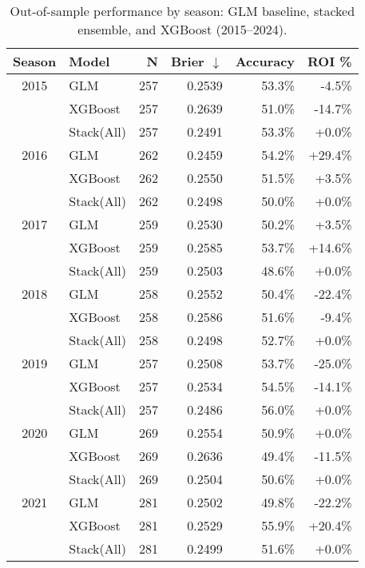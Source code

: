 \begin{table}[t]
  \centering
  \small
  \caption[Out-of-sample results by season]{Out-of-sample performance by season: GLM baseline, stacked ensemble, and XGBoost (2015--2024).}
  \label{tab:oos-record}
  \setlength{\tabcolsep}{2.5pt}\renewcommand{\arraystretch}{1.08}
  \begin{tabular}{@{} c l r r r r @{} }
    \toprule
    \textbf{Season} & \textbf{Model} & \textbf{N} & \textbf{Brier $\downarrow$} & \textbf{Accuracy} & \textbf{ROI \%} \\
    \midrule
    2015 & GLM & 257 & 0.2539 & 53.3\% & -4.5\% \\
     & XGBoost & 257 & 0.2639 & 51.0\% & -14.7\% \\
     & Stack(All) & 257 & 0.2491 & 53.3\% & +0.0\% \\
    \midrule
    2016 & GLM & 262 & 0.2459 & 54.2\% & +29.4\% \\
     & XGBoost & 262 & 0.2550 & 51.5\% & +3.5\% \\
     & Stack(All) & 262 & 0.2498 & 50.0\% & +0.0\% \\
    \midrule
    2017 & GLM & 259 & 0.2530 & 50.2\% & +3.5\% \\
     & XGBoost & 259 & 0.2585 & 53.7\% & +14.6\% \\
     & Stack(All) & 259 & 0.2503 & 48.6\% & +0.0\% \\
    \midrule
    2018 & GLM & 258 & 0.2552 & 50.4\% & -22.4\% \\
     & XGBoost & 258 & 0.2586 & 51.6\% & -9.4\% \\
     & Stack(All) & 258 & 0.2498 & 52.7\% & +0.0\% \\
    \midrule
    2019 & GLM & 257 & 0.2508 & 53.7\% & -25.0\% \\
     & XGBoost & 257 & 0.2534 & 54.5\% & -14.1\% \\
     & Stack(All) & 257 & 0.2486 & 56.0\% & +0.0\% \\
    \midrule
    2020 & GLM & 269 & 0.2554 & 50.9\% & +0.0\% \\
     & XGBoost & 269 & 0.2636 & 49.4\% & -11.5\% \\
     & Stack(All) & 269 & 0.2504 & 50.6\% & +0.0\% \\
    \midrule
    2021 & GLM & 281 & 0.2502 & 49.8\% & -22.2\% \\
     & XGBoost & 281 & 0.2529 & 55.9\% & +20.4\% \\
     & Stack(All) & 281 & 0.2499 & 51.6\% & +0.0\% \\
    \midrule

\end{tabular}
\end{table}
